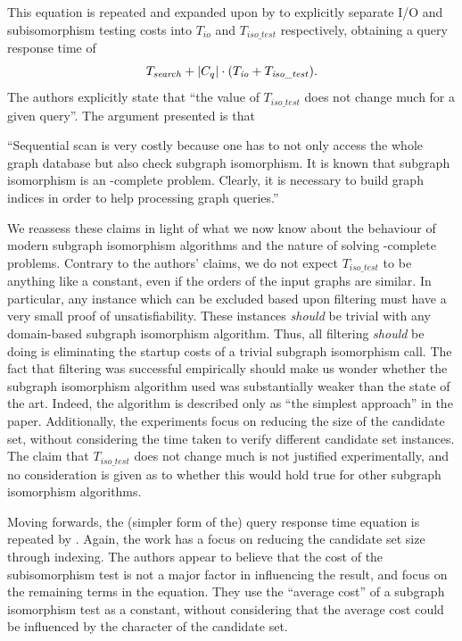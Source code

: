 \documentclass[twoside,11pt]{article}
\begin{document}
This equation is repeated and expanded upon by  to explicitly
separate I/O and subisomorphism testing costs into $T_{\mathit{io}}$ and $T_{\mathit{iso\_test}}$
respectively, obtaining a query response time of \[
    T_{\mathit{search}} + \left|C_q\right| \cdot (T_{\mathit{io}} + T_{\mathit{iso\_test}})
    \textnormal{.} \] The authors explicitly state that ``the value of $T_{\mathit{iso\_test}}$ does
not change much for a given query''. The argument presented is that
\begin{displayquote}``Sequential scan is very costly
because one has to not only access the whole graph database but also check subgraph isomorphism. It
is known that subgraph isomorphism is an \NP-complete problem. Clearly, it is necessary to build
graph indices in order to help processing graph queries.''\end{displayquote}
We reassess these claims in light of
what we now know about the behaviour of modern subgraph isomorphism algorithms and the nature
of solving \NP-complete problems. Contrary to the authors' claims,
we do not expect $T_{\mathit{iso\_test}}$ to be anything like a constant, even if the orders of the
input graphs are similar. In particular, any instance which can be excluded based upon filtering
must have a very small proof of unsatisfiability. These instances \emph{should} be trivial with any
domain-based subgraph isomorphism algorithm. Thus, all filtering \emph{should} be doing is eliminating the startup
costs of a trivial subgraph isomorphism call. The fact that filtering was successful empirically
should make us wonder whether the subgraph isomorphism algorithm used was substantially
weaker than the state of the art.
Indeed, the algorithm is described only as ``the simplest approach'' in the
paper.  Additionally, the experiments focus on reducing the size of the candidate set, without
considering the time taken to verify different candidate set instances.  The claim that
$T_{\mathit{iso\_test}}$ does not change much is not justified experimentally, and no consideration
is given as to whether this would hold true for other subgraph isomorphism algorithms.

Moving forwards, the (simpler form of the) query response time equation is repeated by
. Again, the work has a focus on reducing the candidate set size
through indexing. The authors appear to believe that the cost of the subisomorphism test is not a major
factor in influencing the result, and focus on the remaining terms in the equation. They use the
``average cost'' of a subgraph isomorphism test as a constant, without considering that the average
cost could be influenced by the character of the candidate set.
\end{document}
